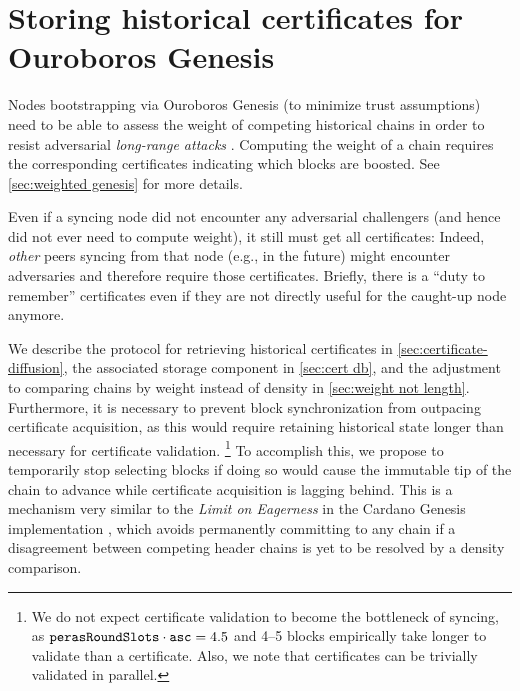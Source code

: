 \section{Storing historical certificates for Ouroboros Genesis}\label{sec:storing historical certs}

Nodes bootstrapping via Ouroboros Genesis (to minimize trust assumptions) need to be able to assess the weight of competing historical chains in order to resist adversarial \emph{long-range attacks} \parencite{genesis-implementation-documentation}.
Computing the weight of a chain requires the corresponding certificates indicating which blocks are boosted.
See \cref{sec:weighted genesis} for more details.

Even if a syncing node did not encounter any adversarial challengers (and hence did not ever need to compute weight), it still must get all certificates:
Indeed, \emph{other} peers syncing from that node (e.g., in the future) might encounter adversaries and therefore require those certificates.
Briefly, there is a \enquote{duty to remember} certificates even if they are not directly useful for the caught-up node anymore.

We describe the protocol for retrieving historical certificates in \cref{sec:certificate-diffusion}, the associated storage component in \cref{sec:cert db}, and the adjustment to comparing chains by weight instead of density in \cref{sec:weight not length}.
Furthermore, it is necessary to prevent block synchronization from outpacing certificate acquisition, as this would require retaining historical state longer than necessary for certificate validation.%
\footnote{We do not expect certificate validation to become the bottleneck of syncing, as $\mathtt{perasRoundSlots} \cdot \mathtt{asc} = \num{4.5}$ and \numrange{4}{5} blocks empirically take longer to validate than a certificate.
  Also, we note that certificates can be trivially validated in parallel.}
To accomplish this, we propose to temporarily stop selecting blocks if doing so would cause the immutable tip of the chain to advance while certificate acquisition is lagging behind.
This is a mechanism very similar to the \emph{Limit on Eagerness} in the Cardano Genesis implementation \parencite{genesis-implementation-documentation}, which avoids permanently committing to any chain if a disagreement between competing header chains is yet to be resolved by a density comparison.

